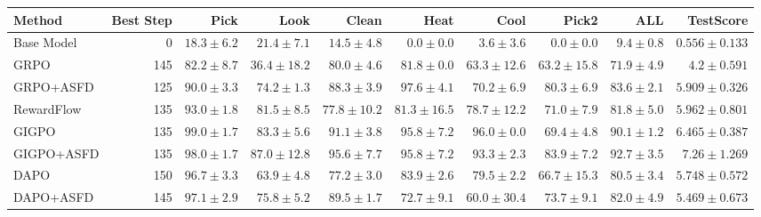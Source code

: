 \begin{tabular}{lrrrrrrrrr}
\toprule
Method & Best Step & Pick & Look & Clean & Heat & Cool & Pick2 & ALL & TestScore \\
\midrule
Base Model & 0 & $18.3 \pm 6.2$ & $21.4 \pm 7.1$ & $14.5 \pm 4.8$ & $0.0 \pm 0.0$ & $3.6 \pm 3.6$ & $0.0 \pm 0.0$ & $9.4 \pm 0.8$ & $0.556 \pm 0.133$ \\
GRPO & 145 & $82.2 \pm 8.7$ & $36.4 \pm 18.2$ & $80.0 \pm 4.6$ & $81.8 \pm 0.0$ & $63.3 \pm 12.6$ & $63.2 \pm 15.8$ & $71.9 \pm 4.9$ & $4.2 \pm 0.591$ \\
GRPO+ASFD & 125 & $90.0 \pm 3.3$ & $74.2 \pm 1.3$ & $88.3 \pm 3.9$ & $97.6 \pm 4.1$ & $70.2 \pm 6.9$ & $80.3 \pm 6.9$ & $83.6 \pm 2.1$ & $5.909 \pm 0.326$ \\
RewardFlow & 135 & $93.0 \pm 1.8$ & $81.5 \pm 8.5$ & $77.8 \pm 10.2$ & $81.3 \pm 16.5$ & $78.7 \pm 12.2$ & $71.0 \pm 7.9$ & $81.8 \pm 5.0$ & $5.962 \pm 0.801$ \\
GIGPO & 135 & $99.0 \pm 1.7$ & $83.3 \pm 5.6$ & $91.1 \pm 3.8$ & $95.8 \pm 7.2$ & $96.0 \pm 0.0$ & $69.4 \pm 4.8$ & $90.1 \pm 1.2$ & $6.465 \pm 0.387$ \\
GIGPO+ASFD & 135 & $98.0 \pm 1.7$ & $87.0 \pm 12.8$ & $95.6 \pm 7.7$ & $95.8 \pm 7.2$ & $93.3 \pm 2.3$ & $83.9 \pm 7.2$ & $92.7 \pm 3.5$ & $7.26 \pm 1.269$ \\
DAPO & 150 & $96.7 \pm 3.3$ & $63.9 \pm 4.8$ & $77.2 \pm 3.0$ & $83.9 \pm 2.6$ & $79.5 \pm 2.2$ & $66.7 \pm 15.3$ & $80.5 \pm 3.4$ & $5.748 \pm 0.572$ \\
DAPO+ASFD & 145 & $97.1 \pm 2.9$ & $75.8 \pm 5.2$ & $89.5 \pm 1.7$ & $72.7 \pm 9.1$ & $60.0 \pm 30.4$ & $73.7 \pm 9.1$ & $82.0 \pm 4.9$ & $5.469 \pm 0.673$ \\
\bottomrule
\end{tabular}
